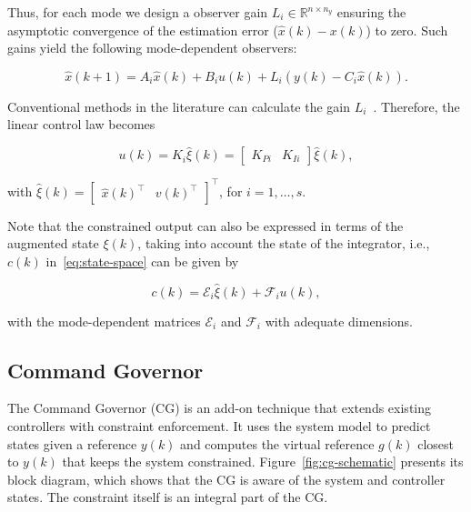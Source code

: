 Thus, for each mode we design a observer gain \(L_{i}\in\mathbb{R}^{n\times{}n_y}\)
ensuring the asymptotic convergence of the estimation error
(\(\hat{x}(k)-x(k)\)) to zero. Such gains yield the following mode-dependent
observers:

\begin{equation}
	\label{eq:observer}
	\hat{x}(k+1) = A_{i}\hat{x}(k) + B_{i}u(k) + L_{i}(y(k)-C_{i}\hat{x}(k)).
\end{equation}

Conventional methods in the literature can calculate the gain
\(L_i\)~\parencite{chen:linear,hespanha:linear}. Therefore, the linear control
law becomes

\begin{equation}
	\label{eq:control-law}
	u(k)= K_i \hat{\xi}(k) = \begin{bmatrix}K_{Pi} & K_{Ii} \end{bmatrix}
	\hat{\xi}(k),
\end{equation}

with \(\hat{\xi}(k) = \begin{bmatrix}\hat{x}{(k)}^\top & v{(k)}^\top
\end{bmatrix}^\top{}\), for \(i=1,\ldots,s\).

Note that the constrained output can also be expressed in terms of the augmented
state \(\xi(k)\), taking into account the state of the integrator, i.e., \(c(k)\)
in~\eqref{eq:state-space} can be given by

\begin{equation}
	\label{eq:constrained-output}
	c(k) = \mathcal{E}_i\hat{\xi}(k) + \mathcal{F}_i u(k),
\end{equation}

with the mode-dependent matrices \(\mathcal{E}_i\) and \(\mathcal{F}_i\) with
adequate dimensions.

\subsection{Command Governor}%
\label{subsec:cg}

The Command Governor (CG) is an add-on technique that extends existing
controllers with constraint enforcement. It uses the system model to predict
states given a reference \(y(k)\) and computes the virtual reference \(g(k)\)
closest to \(y(k)\) that keeps the system constrained.
Figure~\ref{fig:cg-schematic} presents its block diagram, which shows that the
CG is aware of the system and controller states. The constraint itself is an
integral part of the CG.\

